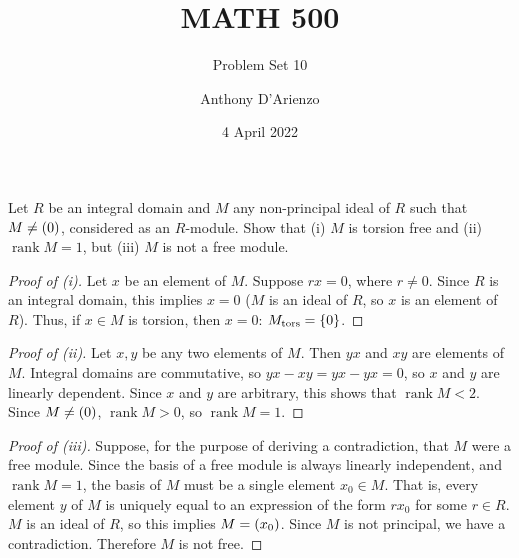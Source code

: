 \documentclass{./typewriter-math}
\title{MATH 500}
\subtitle{Problem Set 10}
\author{Anthony D'Arienzo}
\date{4 April 2022}
\DeclareMathOperator\rank{rank}
\newcommand\tors{\text{tors}}
\begin{document}
	
	\maketitle%

	\begin{exercise}[(DF 12.1.6)]
		Let \(R\) be an integral domain and \(M\) any non-principal ideal of \(R\)
		such that \(M \neq {\left(0\right)}\), considered as an \(R\)-module. Show that
		(i) \(M\) is torsion free and (ii) \(\rank M = 1\), but (iii) \(M\) is not
		a free module.

		\begin{proof}[Proof of (i)]
			Let \(x\) be an element of \(M\). Suppose \(r x = 0\), where \(r \neq
			0\). Since \(R\) is an integral domain, this implies \(x = 0\) (\(M\) is
			an ideal of \(R\), so \(x\) is an element of \(R\)). Thus, if \(x \in M\)
			is torsion, then \(x = 0\): \(M_\tors = \bwrap{0}\).
		\end{proof}

		\begin{proof}[Proof of (ii)]
			Let \(x,y\) be any two elements of \(M\). Then \(yx\) and \(xy\) are
			elements of \(M\). Integral domains are commutative, so \(yx - xy = yx -
			yx = 0\), so \(x\) and \(y\) are linearly dependent. Since \(x\) and
			\(y\) are arbitrary, this shows that \(\rank M < 2\). Since \(M \neq
			{\left(0\right)}\), \(\rank M > 0\), so \(\rank M = 1\).
		\end{proof}

		\begin{proof}[Proof of (iii)]
			Suppose, for the purpose of deriving a contradiction, that \(M\) were a
			free module. Since the basis of a free module is always linearly
			independent, and \(\rank M = 1\), the basis of \(M\) must be a single
			element \(x_0 \in M\). That is, every element \(y\) of \(M\) is uniquely
			equal to an expression of the form \(r x_0\) for some \(r \in R\). \(M\)
			is an ideal of \(R\), so this implies \(M = {\left(x_0\right)}\). Since \(M\) is
			not principal, we have a contradiction. Therefore \(M\) is not free.
		\end{proof}

	\end{exercise}
\end{document}
